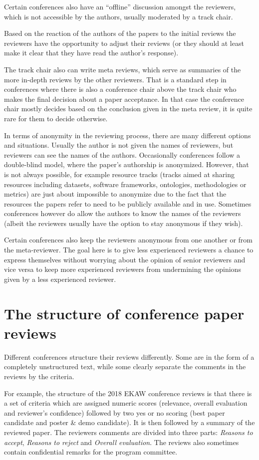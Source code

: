 Certain conferences also have an ``offline'' discussion amongst the reviewers, which is not accessible by the authors, usually moderated by a track chair.

Based on the reaction of the authors of the papers to the initial reviews the reviewers have the opportunity to adjust their reviews (or they should at least make it clear that they have read the author's response).

The track chair also can write meta reviews, which serve as summaries of the more in-depth reviews by the other reviewers. That is a standard step in conferences where there is also a conference chair above the track chair who makes the final decision about a paper acceptance. In that case the conference chair mostly decides based on the conclusion given in the meta review, it is quite rare for them to decide otherwise.

In terms of anonymity in the reviewing process, there are many different options and situations.  Usually the author is not given the names of reviewers, but reviewers can see the names of the authors. Occasionally conferences follow a double-blind model, where the paper's authorship is anonymized. However, that is not always possible, for example resource tracks (tracks aimed at sharing resources including datasets, software frameworks, ontologies, methodologies or metrics) are just about impossible to anonymize due to the fact that the resources the papers refer to need to be publicly available and in use. 
Sometimes conferences however do allow the authors to know the names of the reviewers (albeit the reviewers usually have the option to stay anonymous if they wish).

Certain conferences also keep the reviewers anonymous from one another or from the meta-reviewer. The goal here is to give less experienced reviewers a chance to express themselves without worrying about the opinion of senior reviewers and vice versa to keep more experienced reviewers from undermining the opinions given by a less experienced reviewer.
\section{The structure of conference paper reviews}
\label{sec:rev_structure}
Different conferences structure their reviews differently. Some are in the form of a completely unstructured text, while some clearly separate the comments in the reviews by the criteria. 

For example, the structure of the 2018 EKAW conference reviews is that there is a set of criteria which are assigned numeric scores (relevance, overall evaluation and reviewer's confidence) followed by two yes or no scoring (best paper candidate and poster \& demo candidate). It is then followed by a summary of the reviewed paper. The reviewers comments are divided into three parts: \textit{Reasons to accept}, \textit{Reasons to reject} and \textit{Overall evaluation}. The reviews also sometimes contain confidential remarks for the program committee.

